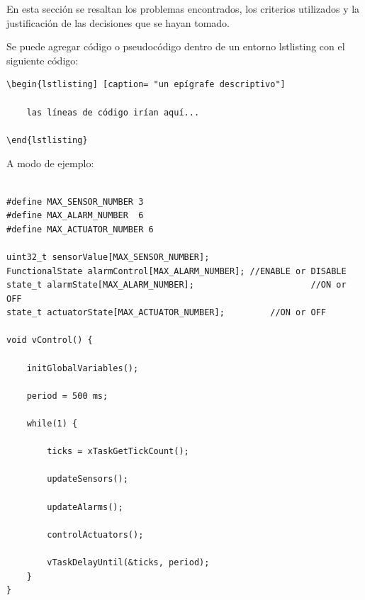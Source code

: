 En esta sección se resaltan los problemas encontrados, los criterios utilizados y la justificación de las decisiones que se hayan tomado.

Se puede agregar código o pseudocódigo dentro de un entorno lstlisting con el siguiente código:

\begin{verbatim}
\begin{lstlisting] [caption= "un epígrafe descriptivo"]

	las líneas de código irían aquí...
	
\end{lstlisting}
\end{verbatim}

A modo de ejemplo:

\begin{lstlisting}[caption=Pseudocódigo del lazo principal de control.]  % Start your code-block

#define MAX_SENSOR_NUMBER 3
#define MAX_ALARM_NUMBER  6
#define MAX_ACTUATOR_NUMBER 6

uint32_t sensorValue[MAX_SENSOR_NUMBER];		
FunctionalState alarmControl[MAX_ALARM_NUMBER];	//ENABLE or DISABLE
state_t alarmState[MAX_ALARM_NUMBER];						//ON or OFF
state_t actuatorState[MAX_ACTUATOR_NUMBER];			//ON or OFF

void vControl() {

	initGlobalVariables();
	
	period = 500 ms;
		
	while(1) {

		ticks = xTaskGetTickCount();
		
		updateSensors();
		
		updateAlarms();
		
		controlActuators();
		
		vTaskDelayUntil(&ticks, period);
	}
}
\end{lstlisting}



